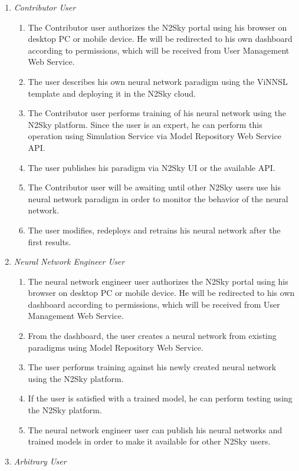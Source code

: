 \begin{enumerate}
\item \emph{Contributor User}
\begin{enumerate}
\item The Contributor user authorizes the N2Sky portal using his browser on desktop PC or mobile device. He will be redirected to his own dashboard according to permissions, which will be received from User Management Web Service. 
\item The user describes his own neural network paradigm using the ViNNSL template and deploying it in the N2Sky cloud. 
\item The Contributor user performs training of his neural network using the N2Sky platform. Since the user is an expert, he can perform this operation using Simulation Service via Model Repository Web Service API.
\item The user publishes his paradigm via N2Sky UI or the available API. 
\item The Contributor user will be awaiting until other N2Sky users use his neural network paradigm in order to monitor the behavior of the neural network. 
\item The user modifies, redeploys and retrains his neural network after the first results. 
\end{enumerate}
\item \emph{Neural Network Engineer User}
\begin{enumerate}
\item The neural network engineer user authorizes the N2Sky portal using his browser on desktop PC or mobile device. He will be redirected to his own dashboard according to permissions, which will be received from User Management Web Service. 
\item From the dashboard, the user creates a neural network from existing paradigms using Model Repository Web Service.
\item The user performs training against his newly created neural network using the N2Sky platform. 
\item If the user is satisfied with a trained model, he can perform testing using the N2Sky platform. 
\item The neural network engineer user can publish his neural networks and trained models in order to make it available for other N2Sky users. 
\end{enumerate}
\item \emph{Arbitrary User}
\begin{enumerate}

\end{enumerate}
\end{enumerate}
